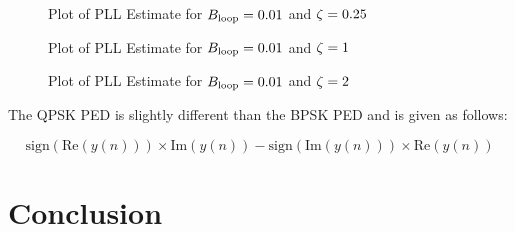 \documentclass{article}
\begin{document}
\begin{figure}[H]
	\centerline{}
	\caption{Plot of PLL Estimate for $\protect{B_\text{loop}} = 0.01$ and $\protect{\zeta = 0.25}$}
	\label{fig::convergence_Bloop_0p01_damp_0p25}
\end{figure}

\begin{figure}[H]
	\centerline{}
	\caption{Plot of PLL Estimate for $\protect{B_\text{loop}} = 0.01$ and $\protect{\zeta = 1}$}
	\label{fig::convergence_Bloop_0p01_damp_1}
\end{figure}

\begin{figure}[H]
	\centerline{}
	\caption{Plot of PLL Estimate for $\protect{B_\text{loop}} = 0.01$ and $\protect{\zeta = 2}$}
	\label{fig::convergence_Bloop_0p01_damp_2}
\end{figure}

\noindent The QPSK PED is slightly different than the BPSK PED and is given as follows:

\begin{equation}
	\text{sign}(\text{Re}(y(n))) \times \text{Im}(y(n)) - \text{sign}(\text{Im}(y(n))) \times \text{Re}(y(n))
\end{equation}

\section{Conclusion}
\end{document}

